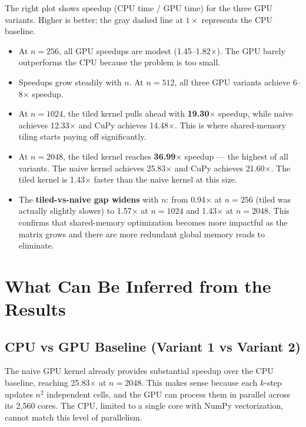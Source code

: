 \documentclass[11pt]{article}
\begin{document}
The right plot shows speedup (CPU time / GPU time) for the three GPU variants. Higher is better; the gray dashed line at $1\times$ represents the CPU baseline.

\begin{itemize}
  \item At \textbf{$n = 256$}, all GPU speedups are modest (1.45--1.82$\times$). The GPU barely outperforms the CPU because the problem is too small.

  \item Speedups grow steadily with $n$. At \textbf{$n = 512$}, all three GPU variants achieve 6--8$\times$ speedup.

  \item At \textbf{$n = 1024$}, the tiled kernel pulls ahead with \textbf{19.30$\times$} speedup, while naive achieves 12.33$\times$ and CuPy achieves 14.48$\times$. This is where shared-memory tiling starts paying off significantly.

  \item At \textbf{$n = 2048$}, the tiled kernel reaches \textbf{36.99$\times$} speedup --- the highest of all variants. The naive kernel achieves 25.83$\times$ and CuPy achieves 21.60$\times$. The tiled kernel is 1.43$\times$ faster than the naive kernel at this size.

  \item The \textbf{tiled-vs-naive gap widens} with $n$: from 0.94$\times$ at $n = 256$ (tiled was actually slightly slower) to 1.57$\times$ at $n = 1024$ and 1.43$\times$ at $n = 2048$. This confirms that shared-memory optimization becomes more impactful as the matrix grows and there are more redundant global memory reads to eliminate.
\end{itemize}

\section{What Can Be Inferred from the Results}

\subsection{CPU vs GPU Baseline (Variant 1 vs Variant 2)}

The naive GPU kernel already provides substantial speedup over the CPU baseline, reaching 25.83$\times$ at $n = 2048$. This makes sense because each $k$-step updates $n^2$ independent cells, and the GPU can process them in parallel across its 2,560 cores. The CPU, limited to a single core with NumPy vectorization, cannot match this level of parallelism.
\end{document}
